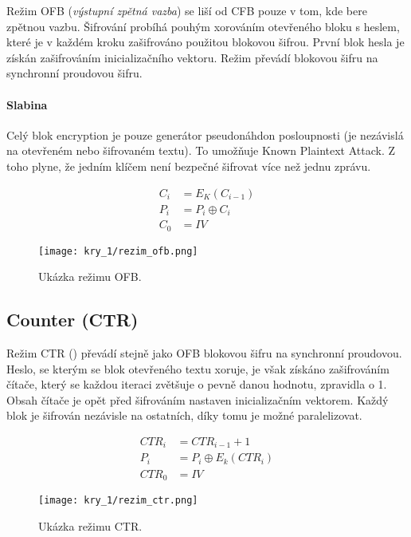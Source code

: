 Režim OFB (\textit{výstupní zpětná vazba}) se liší od CFB pouze v tom, kde bere zpětnou vazbu. Šifrování probíhá pouhým xorováním otevřeného bloku s heslem, které je v každém kroku zašifrováno použitou blokovou šifrou. První blok hesla je získán zašifrováním inicializačního vektoru. Režim převádí blokovou šifru na synchronní proudovou šifru.

\paragraph*{Slabina} Celý blok encryption je pouze generátor pseudonáhdon posloupnosti (je nezávislá na otevřeném nebo šifrovaném textu). To umožňuje Known Plaintext Attack. Z toho plyne, že jedním klíčem není bezpečné šifrovat více než jednu zprávu.

\begin{equation}
\begin{aligned}
C_i &= E_K (C_{i-1}) \\
P_i &= P_i \oplus C_i \\
C_0 &= IV
\end{aligned}
\end{equation}

\begin{figure}[H]
    \centering
    \texttt{[image: kry\_1/rezim\_ofb.png]}
    \caption{Ukázka režimu OFB.}
\end{figure}

\subsection*{Counter (CTR)}

Režim CTR () převádí stejně jako OFB blokovou šifru na synchronní proudovou. Heslo, se kterým se blok otevřeného textu xoruje, je však získáno zašifrováním čítače, který se každou iteraci zvětšuje o pevně danou hodnotu, zpravidla o 1. Obsah čítače je opět před šifrováním nastaven inicializačním vektorem. Každý blok je šifrován nezávisle na ostatních, díky tomu je možné paralelizovat.

\begin{equation}
\begin{aligned}
CTR_i &= CTR_{i-1} + 1 \\
P_i &= P_i \oplus E_k(CTR_i) \\
CTR_0 &= IV
\end{aligned}
\end{equation}

\begin{figure}[H]
    \centering
    \texttt{[image: kry\_1/rezim\_ctr.png]}
    \caption{Ukázka režimu CTR.}
\end{figure}

